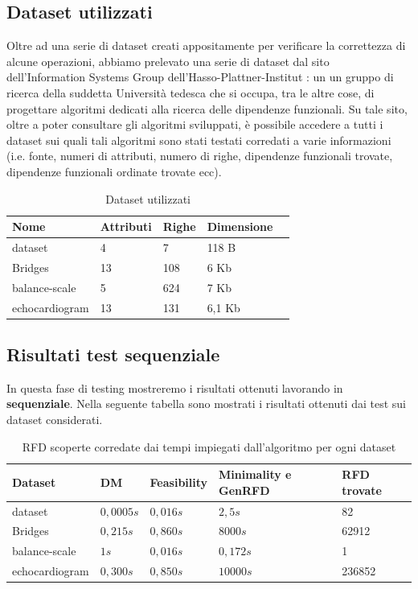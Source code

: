 \subsection{Dataset utilizzati}
Oltre ad una serie di dataset creati appositamente per verificare la correttezza di alcune operazioni, abbiamo prelevato una serie di dataset dal sito dell'Information Systems Group dell'Hasso-Plattner-Institut \cite{metanome}: un un gruppo di ricerca della suddetta Università tedesca che si occupa, tra le altre cose, di progettare algoritmi dedicati alla ricerca delle dipendenze funzionali. Su tale sito, oltre a poter consultare gli algoritmi sviluppati, è possibile accedere a tutti i dataset sui quali tali algoritmi sono stati testati corredati a varie informazioni (i.e. fonte, numeri di attributi, numero di righe, dipendenze funzionali trovate, dipendenze funzionali ordinate trovate ecc).\\
\begin{table}[H]
	\centering
	\begin{tabular}{lllll}
		Nome & Attributi & Righe & Dimensione \\
		\hline
		dataset & 4 & 7 & 118 B \\
		Bridges & 13  & 108 & 6 Kb\\
		balance-scale  & 5  & 624 & 7 Kb\\
		echocardiogram  & 13  & 131 & 6,1 Kb\\
	\end{tabular}
	\caption{Dataset utilizzati}
	\label{datasetUtilizzati}
\end{table}
\subsection{Risultati test sequenziale}
In questa fase di testing mostreremo i risultati ottenuti lavorando in \textbf{sequenziale}.
Nella seguente tabella sono mostrati i risultati ottenuti dai test sui dataset considerati.
\begin{table}[H]
	\centering
	\begin{tabular}{lllll}
		Dataset & DM & Feasibility & Minimality e GenRFD & RFD trovate \\
		\hline
		dataset& $0,0005s$ & $0,016s$ & $2,5s$ & 82 \\
		Bridges & $0,215s$  & $0,860s$ & $8000s$ & 62912 \\
		balance-scale  & $1s$  & $0,016s$ & $0,172s$ & 1\\
		echocardiogram  & $0,300s$  & $0,850s$ & $10000s$ & 236852\\
		\hline
	\end{tabular}
	\label{risultati}
	\caption{RFD scoperte corredate dai tempi impiegati dall'algoritmo per ogni dataset}
\end{table}
